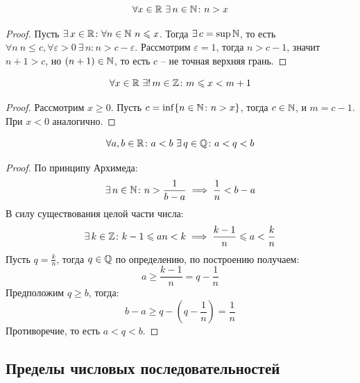 \documentclass[12pt]{article}
\begin{document}
\begin{theorem}
	\[\forall x\in \mathbb{R}\ \exists\,n\in\mathbb{N}\colon n>x\]
	\begin{proof}
		Пусть $\exists\,x\in\mathbb{R}\colon \forall n\in \mathbb{N}\ n\leqslant x$. Тогда
		$\exists\,c=\sup\mathbb{N}$, то есть $\forall n\ n\leqslant c,
		\forall\varepsilon>0\ \exists\,n\colon n>c-\varepsilon$. Рассмотрим
		$\varepsilon=1$, тогда $n>c-1$, значит $n+1>c$, но $(n+1)\in\mathbb{N}$, то
		есть $c$ -- не точная верхняя грань.
	\end{proof}
\end{theorem}
\begin{consequence}
	\[\forall x\in\mathbb{R}\ \exists!\,m\in\mathbb{Z}\colon m\leqslant x < m+1\]
	\begin{proof}
		Рассмотрим $x\geqslant0$. Пусть $c=\inf\{n\in\mathbb{N}\colon n>x\}$, тогда
		$c\in\mathbb{N}$, и $m=c-1$. При $x<0$ аналогично.
	\end{proof}
\end{consequence}
\begin{consequence}[Плотность $\Q$ в $\R$]
	\[\forall a,b\in\mathbb{R}\colon a<b\ \exists\, q\in\mathbb{Q}\colon a<q<b\]
	\begin{proof}
		По принципу Архимеда:
		\[\exists\,n\in\mathbb{N}\colon n>\frac{1}{b-a}\implies \frac{1}{n}<b-a\]
		В силу существования целой части числа:
		\[\exists\,k\in\mathbb{Z}\colon  k-1\leqslant an < k\implies
		\frac{k-1}{n}\leqslant a<\frac{k}{n}\]		Пусть $q=\frac{k}{n}$,
		тогда $q\in\mathbb{Q}$ по определению, по построению получаем:
		\[a\geqslant \frac{k-1}{n}=q-\frac{1}{n}\]
		Предположим $q\geqslant b$, тогда:
		\[b-a\geqslant q-\left(q-\frac{1}{n}\right)=\frac{1}{n}\]
		Противоречие, то есть $a<q<b$.
	\end{proof}
\end{consequence}

\subsection{Пределы числовых последовательностей}
\end{document}
